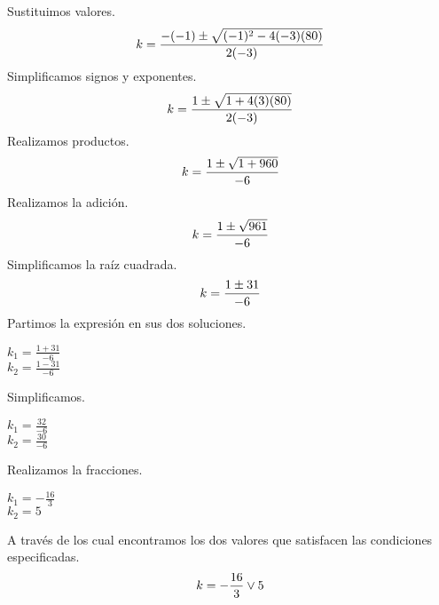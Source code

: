 \documentclass[letterpaper, 10pt]{article}
\begin{document}
        Sustituimos valores.
        \begin{equation} \notag k=\frac{-(-1)\pm \sqrt{(-1)^2-4(-3)(80)}}{2(-3)} \end{equation}
        Simplificamos signos y exponentes.
        \begin{equation} \notag k=\frac{1 \pm \sqrt{1+4(3)(80)}}{2(-3)} \end{equation}
        Realizamos productos.
        \begin{equation} \notag k=\frac{1 \pm \sqrt{1+960}}{-6} \end{equation}
        Realizamos la adición.
        \begin{equation} \notag k=\frac{1 \pm \sqrt{961}}{-6} \end{equation}
        Simplificamos la raíz cuadrada.
        \begin{equation} \notag k=\frac{1 \pm 31}{-6} \end{equation}
        Partimos la expresión en sus dos soluciones.
        \begin{center}
            \begin{multicols}{2}
                $k_1=\frac{1+31}{-6}$ \\
                $k_2=\frac{1-31}{-6}$
            \end{multicols}
        \end{center}
        Simplificamos.
        \begin{center}
            \begin{multicols}{2}
                $k_1=\frac{32}{-6}$ \\
                $k_2=\frac{30}{-6}$
            \end{multicols}
        \end{center}
        Realizamos la fracciones.
        \begin{center}
            \begin{multicols}{2}
                $k_1=-\frac{16}{3}$ \\
                $k_2=5$
            \end{multicols}  
        \end{center}
        A través de los cual encontramos los dos valores que satisfacen las condiciones especificadas.
        \begin{equation} \notag  k=-\frac{16}{3} \vee 5 \end{equation}
    \newpage
\end{document}

